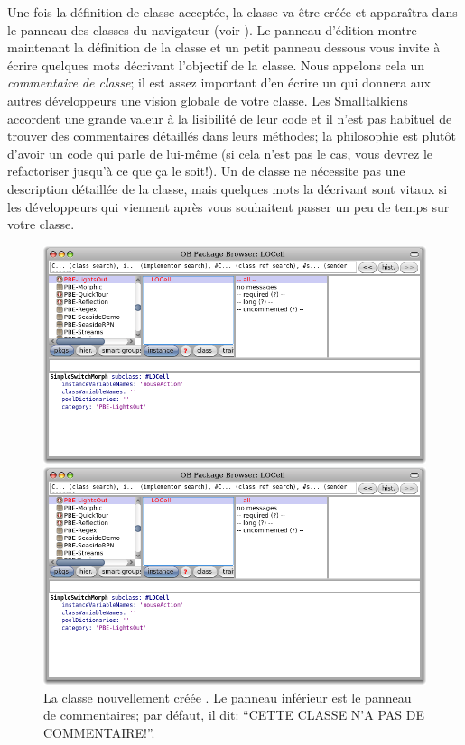 \documentclass[a4paper,10pt,twoside]{book}
\begin{document}
Une fois la définition de classe acceptée, la classe va être créée et
apparaîtra dans le panneau des classes du navigateur (voir ).
Le panneau d'édition montre maintenant la définition de la classe et
un petit panneau dessous vous invite à écrire quelques mots décrivant
l'objectif de la classe. Nous appelons cela un \emph{commentaire de
  classe}; il est assez important d'en écrire un qui donnera aux
autres développeurs une vision 
globale de votre classe.
Les Smalltalkiens accordent une grande valeur à la lisibilité de leur
code et il n'est pas habituel de trouver des commentaires détaillés
dans leurs méthodes; la philosophie est plutôt d'avoir un code qui
parle de lui-même (si cela n'est pas le cas, vous devrez le
refactoriser jusqu'à ce que ça le soit!). 
Un  de classe ne nécessite pas une
description détaillée de la classe, mais quelques mots la décrivant
sont vitaux si les développeurs qui viennent après vous souhaitent
passer un peu de temps sur votre classe.


\begin{figure}[h!t]
\ifluluelse
	{\centerline {\includegraphics[width=\textwidth]{LOCell}}}
	{\centerline {\includegraphics[scale=0.7]{LOCell}}}
\caption{La classe nouvellement créée . Le panneau
  inférieur est le panneau de commentaires; par défaut, il dit:
  ``CETTE CLASSE N'A PAS DE COMMENTAIRE!''.
}
\end{figure}
\end{document}
